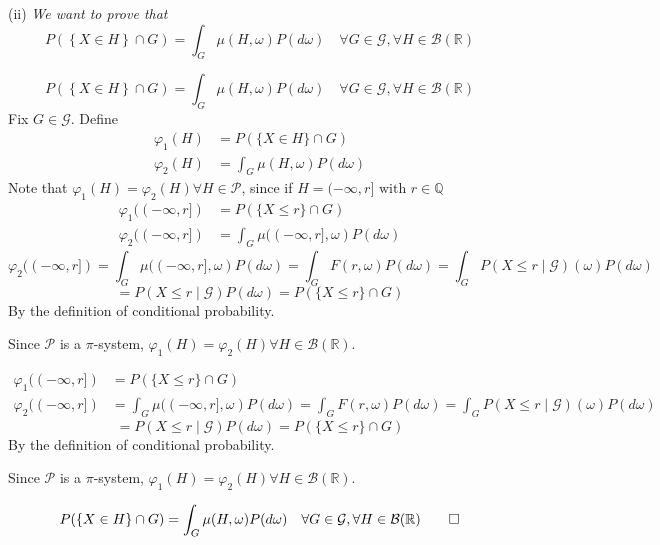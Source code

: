 (ii) \textit{We want to prove that}
\[
P\left(\left\{X \in H\right\} \cap G\right) = \int_G \mu(H, \omega) P(d\omega) \quad \forall G \in \mathcal{G}, \forall H \in \mathcal{B}(\mathbb{R})
\]

\[
P\left(\left\{X \in H\right\} \cap G\right) = \int_G \mu(H, \omega) P(d\omega) \quad \forall G \in \mathcal{G}, \forall H \in \mathcal{B}(\mathbb{R})
\]
Fix \(G \in \mathcal{G}\). Define
\[
\begin{aligned}
    \varphi_1(H) &= P(\{X \in H\} \cap G) \\
    \varphi_2(H) &= \int_G \mu(H, \omega) P(d\omega)
\end{aligned}
\]
Note that \(\varphi_1(H) = \varphi_2(H) \forall H \in \mathcal{P}\), since if \(H = (-\infty, r] \text{ with } r \in \mathbb{Q}\)
\[
\begin{aligned}
    \varphi_1((-\infty, r]) &= P(\{X \leq r\} \cap G) \\
    \varphi_2((-\infty, r]) &= \int_G \mu((-\infty, r], \omega) P(d\omega)
\end{aligned}
\]
\[
\varphi_2((-\infty, r]) = \int_G \mu((-\infty, r], \omega) P(d\omega) = \int_G F(r, \omega) P(d\omega) = \int_G P(X \leq r \mid \mathcal{G})(\omega) P(d\omega)
\]
\[ = P(X \leq r \mid \mathcal{G}) P(d\omega) = P(\{X \leq r\} \cap G) \]
By the definition of conditional probability.

Since \(\mathcal{P}\) is a \(\pi\)-system, \(\varphi_1(H) = \varphi_2(H) \forall H \in \mathcal{B}(\mathbb{R})\). 

\[
\begin{aligned}
    \varphi_1((-\infty, r]) &= P(\{X \leq r\} \cap G) \\
    \varphi_2((-\infty, r]) &= \int_G \mu((-\infty, r], \omega) P(d\omega) = \int_G F(r, \omega) P(d\omega) = \int_G P(X \leq r \mid \mathcal{G})(\omega) P(d\omega)
\end{aligned}
\]
\[ = P(X \leq r \mid \mathcal{G}) P(d\omega) = P(\{X \leq r\} \cap G) \]
By the definition of conditional probability.

Since \(\mathcal{P}\) is a \(\pi\)-system, \(\varphi_1(H) = \varphi_2(H) \forall H \in \mathcal{B}(\mathbb{R})\). 

\[
P(\{X \in H\} \cap G) = \int_G \mu(H, \omega) P(d\omega) \quad \forall G \in \mathcal{G}, \forall H \in \mathcal{B}(\mathbb{R})
\qed
\]

